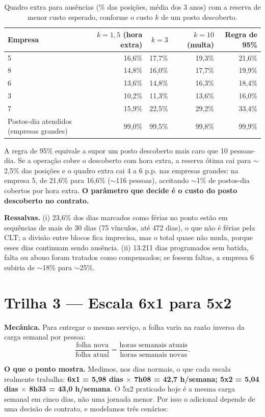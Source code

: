 \documentclass[11pt,a4paper]{article}
\begin{document}
\begin{table}[htbp]
\centering\small
\begin{tabular}{lrrrr}
\toprule
Empresa & $k=1{,}5$ (hora extra) & $k=3$ & $k=10$ (multa) & Regra de 95\% \\
\midrule
5 & 16,6\% & 17,7\% & 19,3\% & 21,6\% \\
8 & 14,8\% & 16,0\% & 17,7\% & 19,9\% \\
6 & 13,6\% & 14,8\% & 16,3\% & 18,4\% \\
3 & 10,2\% & 11,3\% & 13,6\% & 16,0\% \\
7 & 15,9\% & 22,5\% & 29,2\% & 33,4\% \\
\midrule
Postos-dia atendidos (empresas grandes) & 99,0\% & 99,5\% & 99,8\% & 99,9\% \\
\bottomrule
\end{tabular}
\caption{Quadro extra para ausências (\% das posições, média dos 3 anos) com a reserva de menor custo esperado, conforme o custo $k$ de um posto descoberto.}
\end{table}

A regra de 95\% equivale a supor um posto descoberto mais caro que 10 pessoas-dia. Se a operação cobre o descoberto com hora extra, a reserva ótima cai para $\sim$2,5\% das posições e o quadro extra cai 4 a 6 p.p. nas empresas grandes: na empresa 5, de 21,6\% para 16,6\% ($\sim$116 pessoas), aceitando $\sim$1\% de postos-dia cobertos por hora extra. \textbf{O parâmetro que decide é o custo do posto descoberto no contrato.}

\textbf{Ressalvas.} (i) 23,6\% dos dias marcados como férias no ponto estão em sequências de mais de 30 dias (75 vínculos, até 472 dias), o que não é férias pela CLT; a divisão entre blocos fica imprecisa, mas o total quase não muda, porque esses dias continuam sendo ausência. (ii) 13.211 dias programados sem batida, falta ou abono foram tratados como compensados; se fossem faltas, a empresa 6 subiria de $\sim$18\% para $\sim$25\%.

\section{Trilha 3 --- Escala 6x1 para 5x2}\label{sec:t3}
\textbf{Mecânica.} Para entregar o mesmo serviço, a folha varia na razão inversa da carga semanal por pessoa:
\[ \frac{\text{folha nova}}{\text{folha atual}} = \frac{\text{horas semanais atuais}}{\text{horas semanais novas}}. \]

\textbf{O que o ponto mostra.} Medimos, nos dias normais, o que cada escala realmente trabalha: \textbf{6x1 = 5,98 dias $\times$ 7h08 = 42,7 h/semana; 5x2 = 5,04 dias $\times$ 8h33 = 43,0 h/semana}. O 5x2 praticado hoje é a mesma carga semanal em cinco dias, não uma jornada menor. Por isso o adicional depende de uma decisão de contrato, e modelamos três cenários:
\end{document}

